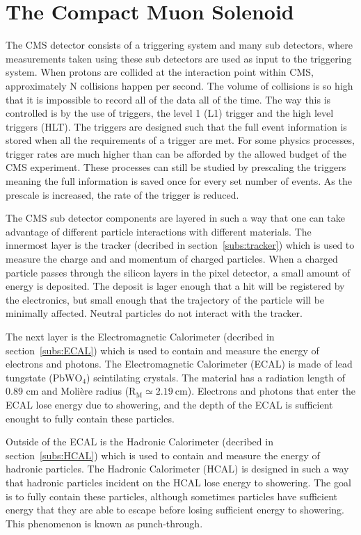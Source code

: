 \section{The Compact Muon Solenoid}
The CMS detector consists of a triggering system and many sub detectors,
where measurements taken using these sub detectors are used as input to the triggering system.
When protons are collided at the interaction point within CMS, approximately N collisions happen per second.
The volume of collisions is so high that it is impossible to record all of the data all of the time.
The way this is controlled is by the use of triggers, the level 1 (L1) trigger and the high level triggers (HLT).
The triggers are designed such that the full event information is stored when all the requirements of a trigger are met.
For some physics processes, trigger rates are much higher than can be afforded by the allowed budget of the CMS experiment.
These processes can still be studied by prescaling the triggers meaning the full information is saved once for every set number of events.
As the prescale is increased, the rate of the trigger is reduced.

The CMS sub detector components are layered in such a way that one can take advantage of different particle interactions with different materials.
The innermost layer is the tracker (decribed in section~\ref{subs:tracker}) which is used to measure the charge and and momentum of charged particles.
When a charged particle passes through the silicon layers in the pixel detector, a small amount of energy is deposited.
The deposit is lager enough that a hit will be registered by the electronics, but small enough that the trajectory of the particle will be minimally affected.
Neutral particles do not interact with the tracker.

The next layer is the Electromagnetic Calorimeter (decribed in section~\ref{subs:ECAL}) which is used to contain and measure the energy of electrons and photons.
The Electromagnetic Calorimeter (ECAL) is made of lead tungstate ($\mathrm{PbWO_{4}}$) scintilating crystals.
The material has a radiation length of 0.89 cm and Moli\`ere radius ($\mathrm{R_{M} \simeq 2.19~cm}$).
Electrons and photons that enter the ECAL lose energy due to showering, and the depth of the ECAL is sufficient enought to fully contain these particles.

Outside of the ECAL is the Hadronic Calorimeter (decribed in section~\ref{subs:HCAL}) which is used to contain and measure the energy of hadronic particles.
The Hadronic Calorimeter (HCAL) is designed in such a way that hadronic particles incident on the HCAL lose energy to showering.
The goal is to fully contain these particles, although sometimes particles have sufficient energy that they are able to escape before losing sufficient energy to showering.
This phenomenon is known as punch-through.

